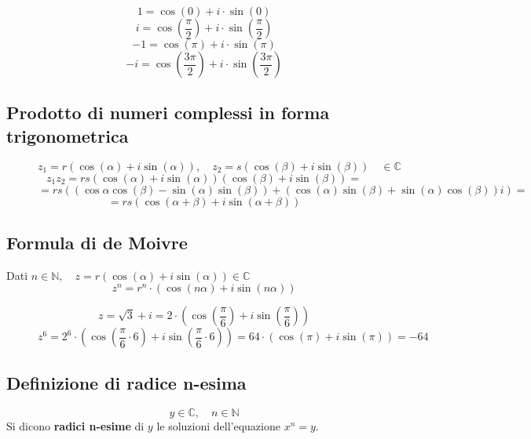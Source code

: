 \documentclass[a4paper]{article}
\theoremstyle{break}
\theoremstyle{break}
\theoremstyle{break}
\theoremstyle{break}
\begin{document}
\begin{figure}[H]
  \begin{example}
    \[
      1 = \cos(0) + i \cdot \sin(0)
    \]
    \[
      i = \cos(\frac{\pi}{2}) + i \cdot \sin(\frac{\pi}{2})
    \]
    \[
      -1 = \cos(\pi) + i \cdot \sin(\pi)
    \]
    \[
      -i = \cos(\frac{3\pi}{2}) + i \cdot \sin(\frac{3\pi}{2})
    \]

  \end{example}
\end{figure}

\subsection{Prodotto di numeri complessi in forma trigonometrica}
\begin{figure}[H]
  \begin{definition}
    \[
      z_1 = r\left(\cos(\alpha) + i \sin(\alpha)\right), \quad z_2 = s\left(\cos(\beta) + i \sin(\beta)\right) \quad \in \mathbb{C}
    \]
    \vspace{0.1cm}
    \[
      z_1  z_2 = r  s  (\cos(\alpha) + i \sin(\alpha))  (\cos(\beta) + i \sin(\beta)) =
    \]
    \[
      = r  s  \left( (\cos{\alpha} \cos(\beta) - \sin(\alpha) \sin(\beta)) + (\cos(\alpha) \sin(\beta) + \sin(\alpha) \cos(\beta))i \right) =
    \]
    \[
      = r  s  \left( \cos(\alpha + \beta) + i \sin(\alpha + \beta) \right)
    \]
  \end{definition}
\end{figure}
\subsection{Formula di de Moivre}
Dati \( n \in \mathbb{N}, \quad z = r(\cos(\alpha) + i \sin(\alpha)) \in \mathbb{C} \)
\[
  z^n = r^n \cdot (\cos(n\alpha) + i \sin(n\alpha))
\]

\begin{figure}[H]
  \begin{example}
    \[
      z = \sqrt{3} + i = 2 \cdot \left( \cos(\frac{\pi}{6}) + i \sin(\frac{\pi}{6}) \right)
    \]
    \[
      z^6 = 2^6 \cdot \left( \cos(\frac{\pi}{6} \cdot 6) + i \sin(\frac{\pi}{6} \cdot 6) \right) = 64 \cdot \left( \cos(\pi) + i \sin(\pi) \right) = -64
    \]
  \end{example}
\end{figure}

\subsection{Definizione di radice n-esima}
\[
  y \in  \mathbb{C}, \quad n \in \mathbb{N}
\]
Si dicono \textbf{radici n-esime} di \( y \) le soluzioni dell'equazione \( x^n = y \).
\end{document}
